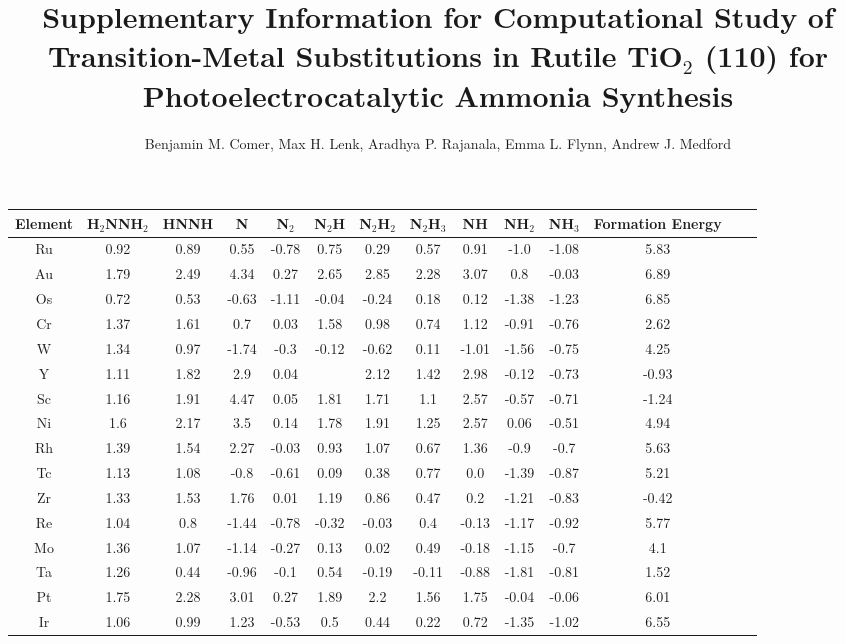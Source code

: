 \documentclass{article}
\title{\TitleFont Supplementary Information for Computational Study of Transition-Metal Substitutions in Rutile TiO$_2$ (110) for Photoelectrocatalytic Ammonia Synthesis}
\author{Benjamin M. Comer, Max H. Lenk, Aradhya P. Rajanala, Emma L. Flynn, Andrew J. Medford}
\begin{document}
\maketitle\begin{table}
\setlength\tabcolsep{2pt}
\begin{center}
\begin{tabular}{| c | c | c | c | c | c | c | c | c | c | c | c | c | c |}
\hline
Element & H$_2$NNH$_2$ & HNNH & N & N$_2$ & N$_2$H & N$_2$H$_2$ & N$_2$H$_3$ & NH & NH$_2$ & NH$_3$ & Formation Energy\\
\hline

Ru & 0.92 & 0.89 & 0.55 & -0.78 & 0.75 & 0.29 & 0.57 & 0.91 & -1.0 & -1.08 & 5.83 \\
Au & 1.79 & 2.49 & 4.34 & 0.27 & 2.65 & 2.85 & 2.28 & 3.07 & 0.8 & -0.03 & 6.89 \\
Os & 0.72 & 0.53 & -0.63 & -1.11 & -0.04 & -0.24 & 0.18 & 0.12 & -1.38 & -1.23 & 6.85 \\
Cr & 1.37 & 1.61 & 0.7 & 0.03 & 1.58 & 0.98 & 0.74 & 1.12 & -0.91 & -0.76 & 2.62 \\
W & 1.34 & 0.97 & -1.74 & -0.3 & -0.12 & -0.62 & 0.11 & -1.01 & -1.56 & -0.75 & 4.25 \\
Y & 1.11 & 1.82 & 2.9 & 0.04 &  & 2.12 & 1.42 & 2.98 & -0.12 & -0.73 & -0.93 \\
Sc & 1.16 & 1.91 & 4.47 & 0.05 & 1.81 & 1.71 & 1.1 & 2.57 & -0.57 & -0.71 & -1.24 \\
Ni & 1.6 & 2.17 & 3.5 & 0.14 & 1.78 & 1.91 & 1.25 & 2.57 & 0.06 & -0.51 & 4.94 \\
Rh & 1.39 & 1.54 & 2.27 & -0.03 & 0.93 & 1.07 & 0.67 & 1.36 & -0.9 & -0.7 & 5.63 \\
Tc & 1.13 & 1.08 & -0.8 & -0.61 & 0.09 & 0.38 & 0.77 & 0.0 & -1.39 & -0.87 & 5.21 \\
Zr & 1.33 & 1.53 & 1.76 & 0.01 & 1.19 & 0.86 & 0.47 & 0.2 & -1.21 & -0.83 & -0.42 \\
Re & 1.04 & 0.8 & -1.44 & -0.78 & -0.32 & -0.03 & 0.4 & -0.13 & -1.17 & -0.92 & 5.77 \\
Mo & 1.36 & 1.07 & -1.14 & -0.27 & 0.13 & 0.02 & 0.49 & -0.18 & -1.15 & -0.7 & 4.1 \\
Ta & 1.26 & 0.44 & -0.96 & -0.1 & 0.54 & -0.19 & -0.11 & -0.88 & -1.81 & -0.81 & 1.52 \\
Pt & 1.75 & 2.28 & 3.01 & 0.27 & 1.89 & 2.2 & 1.56 & 1.75 & -0.04 & -0.06 & 6.01 \\
Ir & 1.06 & 0.99 & 1.23 & -0.53 & 0.5 & 0.44 & 0.22 & 0.72 & -1.35 & -1.02 & 6.55 \\

\end{tabular}
\end{center}
\end{table}
\end{document}

